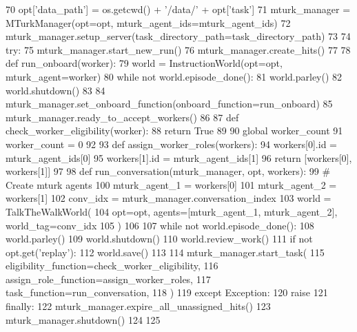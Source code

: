 \begin{DoxyCode}
70     opt[\textcolor{stringliteral}{'data\_path'}] = os.getcwd() + \textcolor{stringliteral}{'/data/'} + opt[\textcolor{stringliteral}{'task'}]
71     mturk\_manager = MTurkManager(opt=opt, mturk\_agent\_ids=mturk\_agent\_ids)
72     mturk\_manager.setup\_server(task\_directory\_path=task\_directory\_path)
73 
74     \textcolor{keywordflow}{try}:
75         mturk\_manager.start\_new\_run()
76         mturk\_manager.create\_hits()
77 
78         \textcolor{keyword}{def }run\_onboard(worker):
79             world = InstructionWorld(opt=opt, mturk\_agent=worker)
80             \textcolor{keywordflow}{while} \textcolor{keywordflow}{not} world.episode\_done():
81                 world.parley()
82                 world.shutdown()
83 
84         mturk\_manager.set\_onboard\_function(onboard\_function=run\_onboard)
85         mturk\_manager.ready\_to\_accept\_workers()
86 
87         \textcolor{keyword}{def }check\_worker\_eligibility(worker):
88             \textcolor{keywordflow}{return} \textcolor{keyword}{True}
89 
90         \textcolor{keyword}{global} worker\_count
91         worker\_count = 0
92 
93         \textcolor{keyword}{def }assign\_worker\_roles(workers):
94             workers[0].id = mturk\_agent\_ids[0]
95             workers[1].id = mturk\_agent\_ids[1]
96             \textcolor{keywordflow}{return} [workers[0], workers[1]]
97 
98         \textcolor{keyword}{def }run\_conversation(mturk\_manager, opt, workers):
99             \textcolor{comment}{# Create mturk agents}
100             mturk\_agent\_1 = workers[0]
101             mturk\_agent\_2 = workers[1]
102             conv\_idx = mturk\_manager.conversation\_index
103             world = TalkTheWalkWorld(
104                 opt=opt, agents=[mturk\_agent\_1, mturk\_agent\_2], world\_tag=conv\_idx
105             )
106 
107             \textcolor{keywordflow}{while} \textcolor{keywordflow}{not} world.episode\_done():
108                 world.parley()
109             world.shutdown()
110             world.review\_work()
111             \textcolor{keywordflow}{if} \textcolor{keywordflow}{not} opt.get(\textcolor{stringliteral}{'replay'}):
112                 world.save()
113 
114         mturk\_manager.start\_task(
115             eligibility\_function=check\_worker\_eligibility,
116             assign\_role\_function=assign\_worker\_roles,
117             task\_function=run\_conversation,
118         )
119     \textcolor{keywordflow}{except} Exception:
120         \textcolor{keywordflow}{raise}
121     \textcolor{keywordflow}{finally}:
122         mturk\_manager.expire\_all\_unassigned\_hits()
123         mturk\_manager.shutdown()
124 
125 
\end{DoxyCode}
